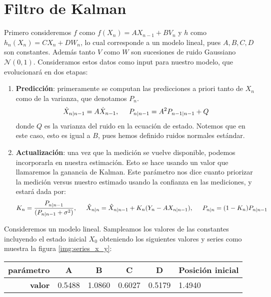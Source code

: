 \documentclass[letterpaper,11pt,oneside]{article}
\begin{document}
\section{Filtro de Kalman}

Primero consideremos $f$ como $ f(X_n) = A X_{n-1} + B V_n$ y $h$ como $ h_n(X_n) = C X_n + DW_n$, lo cual corresponde a un modelo lineal, pues $A,B,C,D$ son constantes. Además tanto $V$ como $W$ son sucesiones de ruido Gaussiano $\mathcal{N}(0,1)$. Consideramos estos datos como input para nuestro modelo, que evolucionará en dos etapas:
\begin{enumerate}
    \item \textbf{Predicción}: primeramente se computan las predicciones a priori tanto de $X_n$ como de la varianza, que denotamos $P_n$.
    $$ \hat X_{n|n-1} = A \hat X_{n-1},\hspace{.5cm} P_{n|n-1} = A^2 P_{n-1|n-1} + Q$$
    donde $Q$ es la varianza del ruido en la ecuación de estado. Notemos que en este caso, esto es igual a $B$, pues hemos definido ruidos normales estándar.
    \item \textbf{Actualización}: una vez que la medición se vuelve disponible, podemos incorporarla en nuestra estimación. Esto se hace usando un valor que llamaremos la ganancia de Kalman. Este parámetro nos dice cuanto priorizar la medición versus nuestro estimado usando la confianza en las mediciones, y estará dada por:
    $$ K_n = \frac{P_{n|n-1}}{(P_{n|n-1}+\sigma^2)},\hspace{.5cm} \hat X_{n|n}=\hat X_{n|n-1}+K_n(Y_n-AX_{n|n-1}),\hspace{.5cm} P_{n|n}=(1-K_n)P_{n|n-1}$$
\end{enumerate}


Consideremos un modelo lineal. Sampleamos los valores de las constantes incluyendo el estado inicial $X_0$ obteniendo los siguientes valores y series como muestra la figura \ref{img:series_x_y}:

\begin{table}
\begin{tabular}{|c|c|c|l|l|l|}
\hline
\textbf{parámetro}                   & \textbf{A}                  & \textbf{B}                  & \multicolumn{1}{c|}{\textbf{C}} & \multicolumn{1}{c|}{\textbf{D}} & \multicolumn{1}{c|}{\textbf{Posición inicial}} \\ \hline
\multicolumn{1}{|r|}{\textbf{valor}} & \multicolumn{1}{r|}{0.5488} & \multicolumn{1}{r|}{1.0860} & 0.6027                          & 0.5179                          & 1.4940                                         \\ \hline
\end{tabular}
\end{table}
\end{document}
